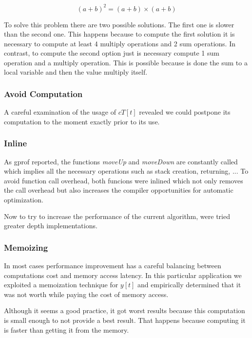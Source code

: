 \documentclass[conference]{IEEEtran}
\begin{document}
\begin{equation}
(a + b)^2 = (a + b) \times (a + b)
\end{equation}

To solve this problem there are two possible solutions. The first one is slower than the second one. This happens because to compute the first solution it is necessary to compute at least 4 multiply operations and 2 sum operations. In contrast, to compute the second option just is necessary compute 1 sum operation and a multiply operation. This is possible because is done the sum to a local variable and then the value multiply itself. 

\subsubsection{Avoid Computation}
A careful examination of the usage of $cT[t]$ revealed we could postpone its computation to the moment exactly prior to its use. 

\subsubsection{Inline}
As gprof reported, the functions \emph{moveUp} and \emph{moveDown} are constantly called which implies all the necessary operations such as stack creation, returning, ... To avoid function call overhead, both funcions were inlined which not only removes the call overhead but also increases the compiler opportunities for automatic optimization.

    Now to try to increase the performance of the current algorithm, were tried greater depth implementations.
    
\subsubsection{Memoizing}
In most cases performance improvement has a careful balancing between computations cost and memory access latency. In this particular application we exploited a memoization technique for $y[t]$ and empirically determined that it was not worth while paying the cost of memory access.

    Although it seems a good practice, it got worst results because this computation is small enough to not provide a best result. That happens because computing it is faster than getting it from the memory.
    
\end{document}
